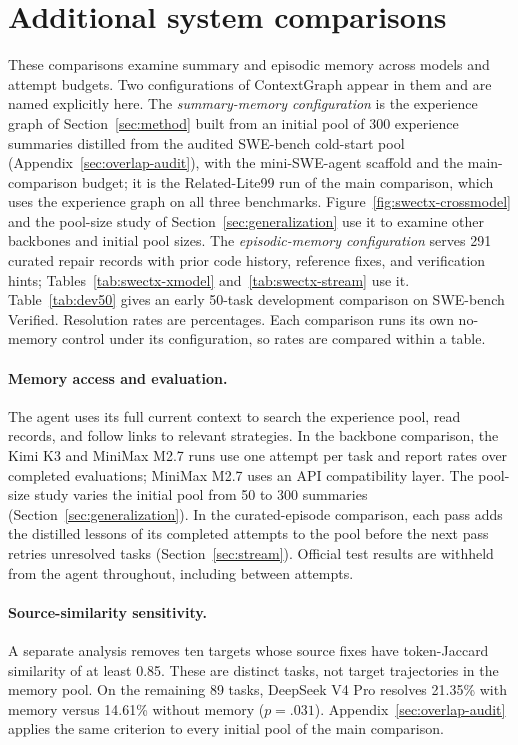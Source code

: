\section{Additional system comparisons}
\label{sec:historical}
These comparisons examine summary and episodic memory across models and
attempt budgets. Two configurations of ContextGraph appear in them and are
named explicitly here. The \emph{summary-memory configuration} is the
experience graph of Section~\ref{sec:method} built from an initial pool of
300 experience summaries distilled from the audited SWE-bench cold-start pool
(Appendix~\ref{sec:overlap-audit}), with the mini-SWE-agent scaffold and the
main-comparison budget; it is the Related-Lite99 run of the main comparison,
which uses the experience graph on all three benchmarks.
Figure~\ref{fig:swectx-crossmodel} and the pool-size study of
Section~\ref{sec:generalization} use it to examine other backbones and initial pool sizes. The
\emph{episodic-memory configuration} serves 291 curated repair records with
prior code history, reference fixes, and verification hints;
Tables~\ref{tab:swectx-xmodel} and~\ref{tab:swectx-stream} use it.
Table~\ref{tab:dev50} gives an early 50-task
development comparison on SWE-bench Verified. Resolution rates are
percentages.
Each comparison runs its own no-memory control under its configuration, so
rates are compared within a table.

\paragraph{Memory access and evaluation.}
The agent uses its full current context to search the experience pool,
read records, and follow links to relevant strategies. In the backbone
comparison, the Kimi K3 and MiniMax M2.7 runs use one attempt per task and
report rates over completed evaluations; MiniMax M2.7 uses an API
compatibility layer. The pool-size study varies the initial pool from 50 to
300 summaries (Section~\ref{sec:generalization}).
In the curated-episode comparison, each pass adds the distilled lessons of its
completed attempts to the pool before the next pass retries unresolved tasks
(Section~\ref{sec:stream}). Official test results are withheld
from the agent throughout, including between attempts.

\paragraph{Source-similarity sensitivity.}
A separate analysis removes ten targets whose source fixes have token-Jaccard
similarity of at least 0.85. These are distinct tasks, not target trajectories
in the memory pool. On the remaining 89 tasks, DeepSeek V4 Pro resolves
21.35\% with memory versus 14.61\% without memory ($p=.031$).
Appendix~\ref{sec:overlap-audit} applies the same criterion to every initial
pool of the main comparison.

